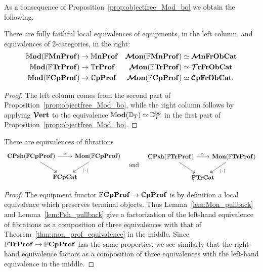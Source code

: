 \documentclass[11pt,oneside,article]{memoir}
\begin{document}
As a consequence of Proposition~\ref{prop:objectfree_Mod_bo} we obtain the following.
\begin{corollary}
      \label{cor:TrCat_ObjectFree}
   There are fully faithful local equivalences of equipments, in the left column, and equivalences
   of 2-categories, in the right:
   \begin{align*}
      \mathbb{M}\mathbf{od}(\mathbb{F}\mathbf{MnProf})  &\to \mathbb{M}\mathbf{nProf} &\bm{\mathcal{M}}\mathbf{on}(\mathbb{F}\mathbf{MnProf})&\simeq\bm{\mathcal{M}}\mathbf{nFrObCat}\\
      \mathbb{M}\mathbf{od}(\mathbb{F}\mathbf{TrProf})   &\to \mathbb{T}\mathbf{rProf}  &\bm{\mathcal{M}}\mathbf{on}(\mathbb{F}\mathbf{TrProf})&\simeq\bm{\mathcal{T}}\mathbf{rFrObCat}\\
      \mathbb{M}\mathbf{od}(\mathbb{F}\mathbf{CpProf}) &\to \mathbb{C}\mathbf{pProf} &\bm{\mathcal{M}}\mathbf{on}(\mathbb{F}\mathbf{CpProf})&\simeq\bm{\mathcal{C}}\mathbf{pFrObCat}.
   \end{align*}
\end{corollary}
\begin{proof}
   The left column comes from the second part of Proposition~\ref{prop:objectfree_Mod_bo}, while
   the right column follows by applying $\bm{\mathcal{V}}\mathbf{ert}$ to the equivalence
   $\mathbb{M}\mathbf{od}(\mathbb{D}_T)\simeq\mathbb{D}^{\mathsf{bo}}_F$ in the first part of
   Proposition~\ref{prop:objectfree_Mod_bo}.
\end{proof}

\begin{lemma}
      \label{lem:FrCompProf_Psh_Mon}
   There are equivalences of fibrations
   \begin{equation*}
      \begin{tikzcd}[column sep=-1.25em]
         \CPsh(\dFrCompProf) \ar[rr,"\equiv"] \ar[dr,two heads]
            && \Mon(\dFrCompProf) \ar[dl,two heads,"\MOb"] \\
            & \FrCompCat &
      \end{tikzcd}
      \quad\tn{and}\quad
        \begin{tikzcd}[column sep=-1.25em]
         \CPsh(\dFrTrProf) \ar[rr,"\equiv"] \ar[dr,two heads]
            && \Mon(\dFrTrProf) \ar[dl,two heads,"\MOb"] \\
            & \FrTrCat &
      \end{tikzcd}
   \end{equation*}
\end{lemma}
\begin{proof}
   The equipment functor $\mathbb{F}\mathbf{CpProf}\to\mathbb{C}\mathbf{pProf}$ is by definition a local equivalence which preserves terminal objects. Thus Lemma~\ref{lem:Mon_pullback} and Lemma~\ref{lem:Psh_pullback} give a factorization of the left-hand equivalence of fibrations as a composition of three equivalences with that of Theorem~\ref{thm:mon_prof_equivalence} in the middle. Since $\mathbb{F}\mathbf{TrProf}\to\mathbb{F}\mathbf{CpProf}$ has the same properties, we see similarly that the right-hand equivalence factors as a composition of three equivalences with the left-hand equivalence in the middle.
\end{proof}
\end{document}
